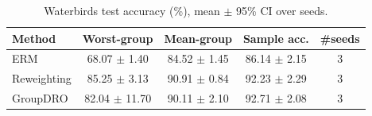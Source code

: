 \begin{table}[t]
\centering
\small
\caption{Waterbirds test accuracy (\%), mean $\pm$ 95\% CI over seeds.}
\label{tab:waterbirds}
\begin{tabular}{lcccc}
\toprule
Method & Worst-group & Mean-group & Sample acc. & \#seeds \\
\midrule
ERM & 68.07 $\pm$ 1.40 & 84.52 $\pm$ 1.45 & 86.14 $\pm$ 2.15 & 3 \\
Reweighting & 85.25 $\pm$ 3.13 & 90.91 $\pm$ 0.84 & 92.23 $\pm$ 2.29 & 3 \\
GroupDRO & 82.04 $\pm$ 11.70 & 90.11 $\pm$ 2.10 & 92.71 $\pm$ 2.08 & 3 \\
\bottomrule
\end{tabular}
\end{table}